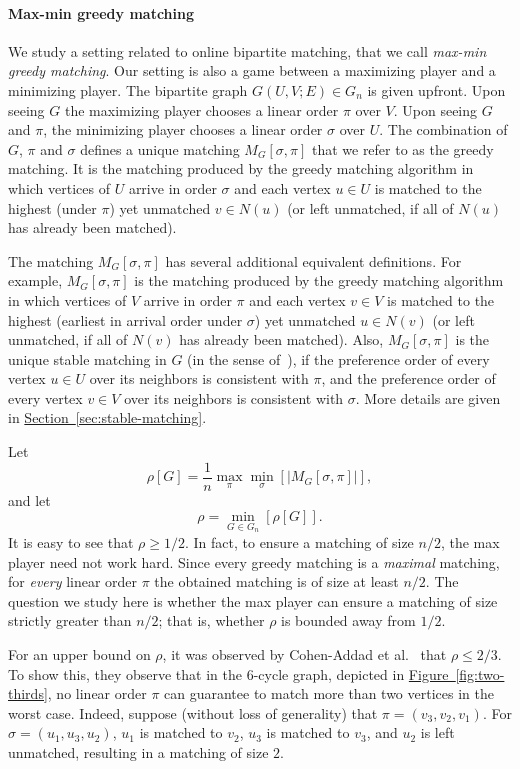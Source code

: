 \documentclass[11pt]{article}
\numberwithin{equation}{section}
\theoremstyle{definition}
\theoremstyle{plain}
\newcommand{\expref}[2]{\hyperref[#2]{#1~\ref{#2}}}
\theoremstyle{plain}
\begin{document}
\paragraph*{Max-min greedy matching} We study a setting related to online bipartite matching, that we call
%
%
%
%
\emph{max-min greedy matching}.   %
Our setting is also a game between a maximizing player and a minimizing player. The bipartite graph $G(U,V;E)\in G_n$ is given upfront. Upon seeing $G$ the maximizing player chooses a linear order $\pi$ over $V$. Upon seeing $G$ and $\pi$, the minimizing player chooses a linear order $\sigma$ over $U$.
The combination of $G$, $\pi$ and $\sigma$ %
defines   %
a unique matching $M_G[\sigma,\pi]$ that we refer to as the greedy matching.
It is the matching produced by the greedy matching algorithm in which vertices of $U$ arrive in order $\sigma$ and each vertex $u \in U$ is matched to the highest (under $\pi$) yet unmatched $v \in N(u)$ (or left unmatched, if
%
all of $N(u)$ has already been matched).   %

The matching $M_G[\sigma,\pi]$ has several additional equivalent definitions.
For example, $M_G[\sigma,\pi]$ is the matching produced by the greedy matching algorithm in which vertices of $V$ arrive in order $\pi$ and each vertex $v \in V$ is matched to the highest (earliest in arrival order under $\sigma$) yet unmatched $u \in N(v)$ (or left unmatched, if
%
all of $N(v)$ has already been matched).  %
Also, $M_G[\sigma,\pi]$ is the unique stable matching in $G$ (in the sense of~\cite{GS62}), if the preference order of every vertex $u \in U$ over its neighbors is consistent with $\pi$, and the preference order of every vertex $v \in V$ over its neighbors is consistent with $\sigma$. More details are given in \expref{Section}{sec:stable-matching}.

Let $$\rho[G] = \frac{1}{n} \max_{\pi} \min_{\sigma}[|M_G[\sigma,\pi]|],$$ and let $$\rho = \min_{G \in G_n}[\rho[G]].$$
It is easy to see that $\rho \ge 1/2$.
In fact, to ensure a matching of size $n/2$, the max player need not work hard.
Since every greedy matching is a \emph{maximal} matching, for \emph{every} linear order $\pi$ the obtained matching is of size at least $n/2$.
The question we study %
here  %
is whether the max player can ensure a matching of size strictly 
greater than $n/2$; that is, whether $\rho$ is bounded away from $1/2$.  
%
%
%

For an upper bound on $\rho$, it was observed by Cohen-Addad et al.~\cite{Cohen-AddadEFF16} that $\rho \leq 2/3$.
To show this, they observe that in the 6-cycle graph, depicted in \expref{Figure}{fig:two-thirds}, no linear order $\pi$ can guarantee to match more than two vertices in the worst case. Indeed, suppose (without loss of generality) that $\pi=(v_3,v_2,v_1)$. For $\sigma=(u_1,u_3,u_2)$, $u_1$ is matched to $v_2$, $u_3$ is matched to $v_3$, and $u_2$ is left unmatched, resulting in a matching of size $2$.
\end{document}
